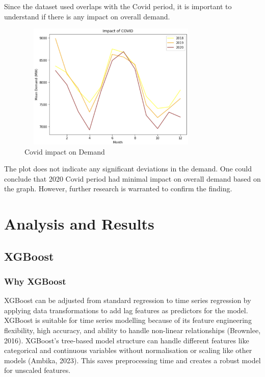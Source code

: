 \documentclass[mstat,12pt]{unswthesis}
\begin{document}
Since the dataset used overlaps with the Covid period, it is important
to understand if there is any impact on overall demand.

\begin{figure}[H]
\centering
\includegraphics[width=0.80\textwidth,height=6cm]{covid_impact.png}
\caption{Covid impact on Demand}
\label{covid_impact}
\end{figure}

The plot does not indicate any significant deviations in the demand. One
could conclude that 2020 Covid period had minimal impact on overall
demand based on the graph. However, further research is warranted to
confirm the finding.

\chapter{Analysis and Results}\label{analysis-and-results}

\section{XGBoost}\label{xgboost}

\subsection{Why XGBoost}\label{why-xgboost}

XGBoost can be adjusted from standard regression to time series
regression by applying data transformations to add lag features as
predictors for the model. XGBoost is suitable for time series modelling
because of its feature engineering flexibility, high accuracy, and
ability to handle non-linear relationships (Brownlee, 2016). XGBoost's
tree-based model structure can handle different features like
categorical and continuous variables without normalisation or scaling
like other models (Ambika, 2023). This saves preprocessing time and
creates a robust model for unscaled features.
\end{document}
